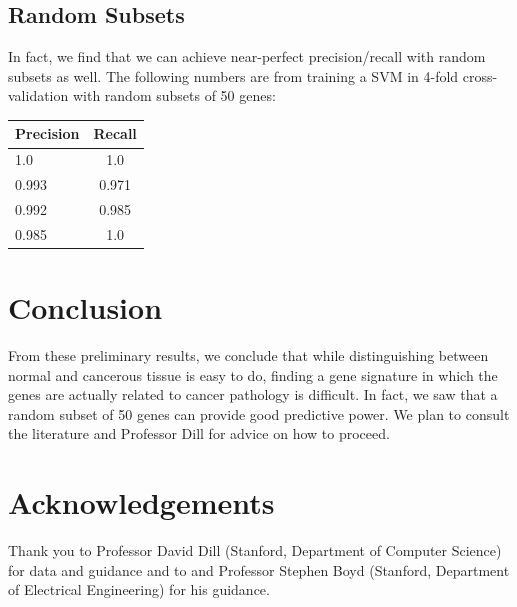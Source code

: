\documentclass[11pt]{article}
\begin{document}
\subsection{Random Subsets}

In fact, we find that we can achieve near-perfect precision/recall with random subsets as well. The following numbers are from training a SVM in 4-fold cross-validation with random subsets of 50 genes:
\begin{tabular}{ l | c }
    Precision & Recall\\
  \hline 
    1.0 & 1.0 \\
    0.993 & 0.971 \\
    0.992 & 0.985 \\
    0.985 & 1.0 \\
  \hline
\end{tabular}
\section{Conclusion}
From these preliminary results, we conclude that while distinguishing between normal and cancerous tissue is easy to do, finding a gene signature in which the genes are actually related to cancer pathology is difficult. In fact, we saw that a random subset of 50 genes can provide good predictive power. We plan to consult the literature and Professor Dill for advice on how to proceed. 

\section{Acknowledgements}
Thank you to Professor David Dill (Stanford, Department of Computer Science) for data and guidance and to and Professor Stephen Boyd (Stanford, Department of Electrical Engineering) for his guidance.
\end{document}
